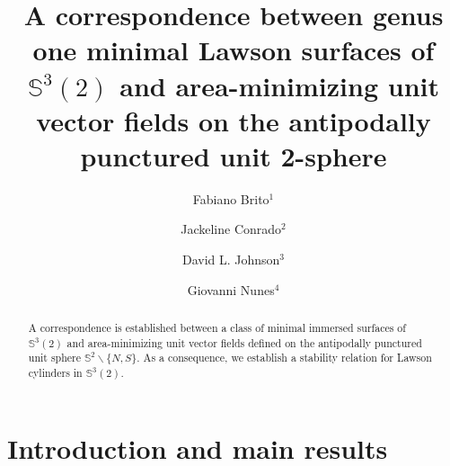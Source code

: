 \documentclass[reqno,11pt]{amsart}
\begin{document}
\title[]{A correspondence between genus one minimal Lawson surfaces of $\mathbb{S}^3(2)$ and area-minimizing unit vector fields on the antipodally punctured unit 2-sphere}
\author{Fabiano Brito$^1$}
\author{Jackeline Conrado$^2$}
\author{David L. Johnson$^3$}
\author{Giovanni Nunes$^4$}



\address{Centro de Matem\'atica, Computa\c c\~{a}o e Cogni\c c\~{a}o, 
Universidade Federal do ABC, Santo Andr\'{e} - SP, 09210-170, Brazil}


\address{Departamento de Geometria e Representação Gráfica, Instituto de Matem\'{a}tica e Estat\'{i}stica, 
Universidade do Estado do Rio de Janeiro, Rua São Francisco Xavier, 524 - Pavilhão Reitor João Lyra Filho, Rio de Janeiro - RJ, 20550-900, Brazil}


\address{Department of Mathematics, Lehigh University, 17 University Walk,
Bethlehem, PA 18105, USA.}



\address{Departamento de Matem\'atica e Estat\'istica, Instituto de F\'isica e Matem\'{a}tica,
Universidade Federal de Pelotas, Rua Gomes Carneiro 1, Centro - Pelotas, 96010-610, Brazil}






\begin{abstract}
A correspondence is established between a class of minimal immersed surfaces of $\mathbb{S}^3(2)$ and area-minimizing unit vector fields defined on the antipodally punctured unit sphere $\mathbb{S}^2\backslash\{N,S\}$.
As a consequence, we establish a stability relation for Lawson cylinders in $\mathbb{S}^3(2)$.

\end{abstract}



\maketitle

\section{Introduction and main results}
\end{document}
